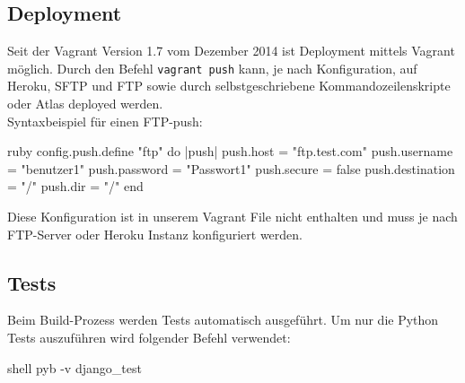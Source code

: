 \subsection{Deployment}
Seit der Vagrant Version 1.7 vom Dezember 2014 ist Deployment mittels Vagrant möglich. Durch den Befehl \texttt{vagrant push} kann, je nach Konfiguration, auf Heroku, SFTP und FTP sowie durch selbstgeschriebene Kommandozeilenskripte oder Atlas deployed werden.
\\Syntaxbeispiel für einen FTP-push: \cite{vagrant-deployment}
\begin{src}{ruby}
config.push.define "ftp" do |push|
  push.host = "ftp.test.com"
  push.username = "benutzer1"
  push.password = "Passwort1"
  push.secure = false
  push.destination = "/"
  push.dir = "/"
end
\end{src}
Diese Konfiguration ist in unserem Vagrant File nicht enthalten und muss je nach FTP-Server oder Heroku Instanz konfiguriert werden.

\subsection{Tests}
Beim Build-Prozess werden Tests automatisch ausgeführt. Um nur die Python Tests auszuführen wird folgender Befehl verwendet:
\begin{src}{shell}
pyb -v django_test
\end{src}